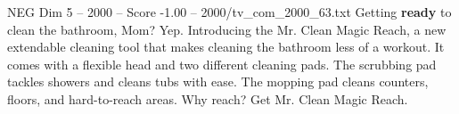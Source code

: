 \begin{textsample}{NEG Dim 5 – 2000 – Score -1.00 – 2000/tv\_com\_2000\_63.txt}  \label{ex:f5_neg_037}
Getting \textbf{ready} to clean the bathroom, Mom?
Yep.
Introducing the Mr.
Clean Magic Reach, a new extendable cleaning tool that makes cleaning the bathroom less of a workout.
It comes with a flexible head and two different cleaning pads.
The scrubbing pad tackles showers and cleans tubs with ease.
The mopping pad cleans counters, floors, and hard-to-reach areas.
Why reach?
Get Mr.
Clean Magic Reach.

\end{textsample}
